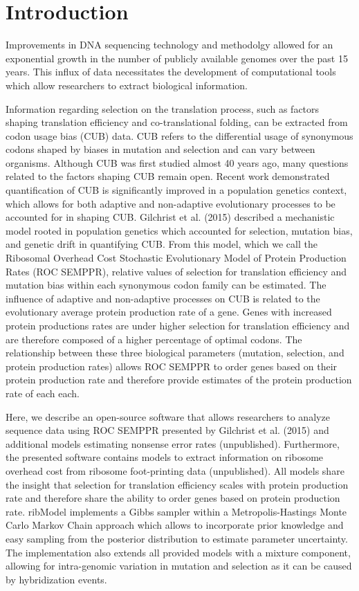 \documentclass{bioinfo}
\newcommand{\package}{ribModel } %
\begin{document}
\section*{Introduction}
Improvements in DNA sequencing technology and methodolgy allowed for an exponential growth in the number of publicly available genomes over the past 15 years.
This influx of data necessitates the development of computational tools which allow researchers to extract biological information.

Information regarding selection on the translation process, such as factors shaping translation efficiency and co-translational folding, can be extracted from codon usage bias (CUB) data.
CUB refers to the differential usage of synonymous codons shaped by biases in mutation and selection and can vary between organisms.
Although CUB was first studied almost 40 years ago, many questions related to the factors shaping CUB remain open.
Recent work demonstrated quantification of CUB is significantly improved in a population genetics context, which allows for both adaptive and non-adaptive evolutionary processes to be accounted for in shaping CUB.
Gilchrist et al. (2015) described a mechanistic model rooted in population genetics which accounted for selection, mutation bias, and genetic drift in quantifying CUB. 
From this model, which we call the Ribosomal Overhead Cost Stochastic Evolutionary Model of Protein Production Rates (ROC SEMPPR), relative values of selection for translation efficiency and mutation bias within each synonymous codon family can be estimated. 
The influence of adaptive and non-adaptive processes on CUB is related to the evolutionary average protein production rate of a gene. Genes with increased protein productions rates are under higher selection for translation efficiency and are therefore composed of a higher percentage of optimal codons. The relationship between these three biological parameters (mutation, selection, and protein production rates) allows ROC SEMPPR to order genes based on their protein production rate and therefore provide estimates of the protein production rate of each each. 

Here, we describe an open-source software that allows researchers to analyze sequence data using ROC SEMPPR presented by Gilchrist et al. (2015) and additional models estimating nonsense error rates (unpublished). Furthermore, the presented software contains models to extract information on ribosome overhead cost from ribosome foot-printing data (unpublished). All models share the insight that selection for translation efficiency scales with protein production rate and therefore share the ability to order genes based on protein production rate. \package implements a Gibbs sampler within a Metropolis-Hastings Monte Carlo Markov Chain approach which allows to incorporate prior knowledge and easy sampling from the posterior distribution to estimate parameter uncertainty. The implementation also extends all provided models with a mixture component, allowing for intra-genomic variation in mutation and selection as it can be caused by hybridization events.
\end{document}
